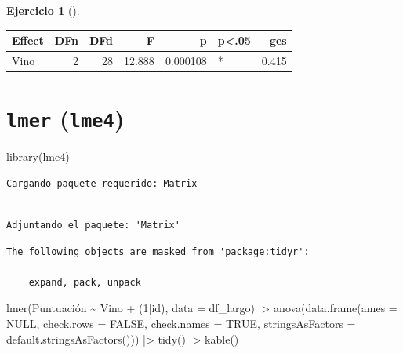 \documentclass[
  a4paper,
]{scrreport}
\newenvironment{Shaded}{\begin{snugshade}}{\end{snugshade}}
\newcommand{\AttributeTok}[1]{\textcolor[rgb]{0.40,0.45,0.13}{#1}}
\newcommand{\ConstantTok}[1]{\textcolor[rgb]{0.56,0.35,0.01}{#1}}
\newcommand{\DecValTok}[1]{\textcolor[rgb]{0.68,0.00,0.00}{#1}}
\newcommand{\FunctionTok}[1]{\textcolor[rgb]{0.28,0.35,0.67}{#1}}
\newcommand{\NormalTok}[1]{\textcolor[rgb]{0.00,0.23,0.31}{#1}}
\newcommand{\SpecialCharTok}[1]{\textcolor[rgb]{0.37,0.37,0.37}{#1}}
\theoremstyle{definition}
\newtheorem{exercise}{Ejercicio}[chapter]
\theoremstyle{remark}
\begin{document}
\begin{exercise}[]
\begin{enumerate}
\begin{tcolorbox}
  \begin{longtable}[]{@{}lrrrrlr@{}}
  \toprule\noalign{}
  Effect & DFn & DFd & F & p & p\textless.05 & ges \\
  \midrule\noalign{}
  \endhead
  \bottomrule\noalign{}
  \endlastfoot
  Vino & 2 & 28 & 12.888 & 0.000108 & * & 0.415 \\
  \end{longtable}

  \section{\texorpdfstring{\texttt{lmer} (\texttt{lme4})}{lmer (lme4)}}

\begin{Shaded}
\begin{Highlighting}[]
\FunctionTok{library}\NormalTok{(lme4)}
\end{Highlighting}
\end{Shaded}

\begin{verbatim}
Cargando paquete requerido: Matrix
\end{verbatim}

\begin{verbatim}

Adjuntando el paquete: 'Matrix'
\end{verbatim}

\begin{verbatim}
The following objects are masked from 'package:tidyr':

    expand, pack, unpack
\end{verbatim}

\begin{Shaded}
\begin{Highlighting}[]
\FunctionTok{lmer}\NormalTok{(Puntuación }\SpecialCharTok{\textasciitilde{}}\NormalTok{ Vino }\SpecialCharTok{+}\NormalTok{ (}\DecValTok{1}\SpecialCharTok{|}\NormalTok{id), }\AttributeTok{data =}\NormalTok{ df\_largo) }\SpecialCharTok{|\textgreater{}} 
\FunctionTok{anova}\NormalTok{(}\FunctionTok{data.frame}\NormalTok{(}\AttributeTok{ames =} \ConstantTok{NULL}\NormalTok{, }\AttributeTok{check.rows =} \ConstantTok{FALSE}\NormalTok{, }\AttributeTok{check.names =} \ConstantTok{TRUE}\NormalTok{, }\AttributeTok{stringsAsFactors =} \FunctionTok{default.stringsAsFactors}\NormalTok{())) }\SpecialCharTok{|\textgreater{}}
    \FunctionTok{tidy}\NormalTok{() }\SpecialCharTok{|\textgreater{}} 
    \FunctionTok{kable}\NormalTok{()}
\end{Highlighting}
\end{Shaded}


\end{tcolorbox}
\end{enumerate}
\end{exercise}
\end{document}
